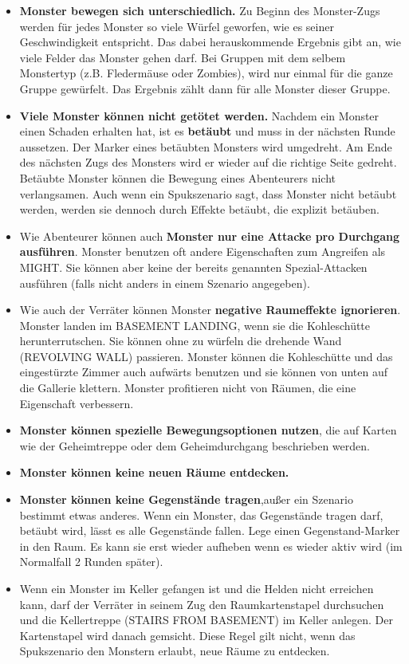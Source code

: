   \begin{itemize}
    \item \textbf{Monster bewegen sich unterschiedlich.} Zu Beginn des Monster-Zugs werden für jedes Monster so viele Würfel geworfen, wie es seiner Geschwindigkeit entspricht. Das dabei herauskommende Ergebnis gibt an, wie viele Felder das Monster gehen darf. Bei Gruppen mit dem selbem Monstertyp (z.B. Fledermäuse oder Zombies), wird nur einmal für die ganze Gruppe gewürfelt. Das Ergebnis zählt dann für alle Monster dieser Gruppe.
    \item \textbf{Viele Monster können nicht getötet werden.} Nachdem ein Monster einen Schaden erhalten hat, ist es \textbf{betäubt} und muss in der nächsten Runde aussetzen. Der Marker eines betäubten Monsters wird umgedreht. Am Ende des nächsten Zugs des Monsters wird er wieder auf die richtige Seite gedreht. Betäubte Monster können die Bewegung eines Abenteurers nicht verlangsamen. Auch wenn ein Spukszenario sagt, dass Monster nicht betäubt werden, werden sie dennoch durch Effekte betäubt, die explizit betäuben.
    \item Wie Abenteurer können auch \textbf{Monster nur eine Attacke pro Durchgang ausführen}. Monster benutzen oft andere Eigenschaften zum Angreifen als MIGHT. Sie können aber keine der bereits genannten Spezial-Attacken ausführen (falls nicht anders in einem Szenario angegeben).


    \item Wie auch der Verräter können Monster \textbf{negative Raumeffekte ignorieren}. Monster landen im BASEMENT LANDING, wenn sie die Kohleschütte herunterrutschen. Sie können ohne zu würfeln die drehende Wand (REVOLVING WALL) passieren. Monster können die Kohleschütte und das eingestürzte Zimmer auch aufwärts benutzen und sie können von unten auf die Gallerie klettern. Monster profitieren nicht von Räumen, die eine Eigenschaft verbessern.

    \item \textbf{Monster können spezielle Bewegungsoptionen nutzen}, die auf Karten wie der Geheimtreppe oder dem Geheimdurchgang beschrieben werden.

    \item \textbf{Monster können keine neuen Räume entdecken.}
    \item \textbf{Monster können keine Gegenstände tragen},außer ein Szenario bestimmt etwas anderes. Wenn ein Monster, das Gegenstände tragen darf, betäubt wird, lässt es alle Gegenstände fallen. Lege einen Gegenstand-Marker in den Raum. Es kann sie erst wieder aufheben wenn es wieder aktiv wird (im Normalfall 2 Runden später).

    \item Wenn ein Monster im Keller gefangen ist und die Helden nicht erreichen kann, darf der Verräter in seinem Zug den Raumkartenstapel durchsuchen und die Kellertreppe (STAIRS FROM BASEMENT) im Keller anlegen. Der Kartenstapel wird danach gemsicht. Diese Regel gilt nicht, wenn das Spukszenario den Monstern erlaubt, neue Räume zu entdecken.
  \end{itemize}

